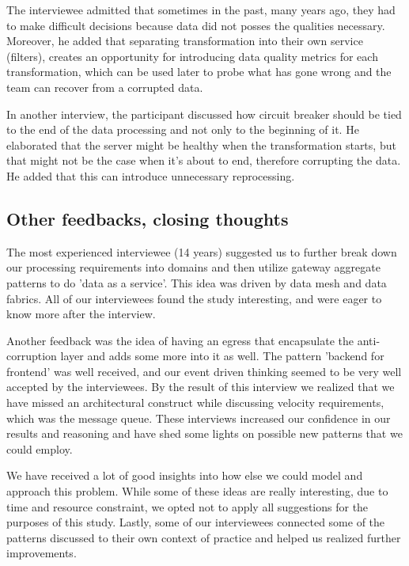 \documentclass{bmcart}
\begin{document}
The interviewee admitted that sometimes in the past, many years ago, they had to make difficult decisions because data did not posses the qualities necessary. Moreover, he added that separating transformation into their own service (filters), creates an opportunity for introducing data quality metrics for each transformation, which can be used later to probe what has gone wrong and the team can recover from a corrupted data.

In another interview, the participant discussed how circuit breaker should be tied to the end of the data processing and not only to the beginning of it. He elaborated that the server might be healthy when the transformation starts, but that might not be the case when it's about to end, therefore corrupting the data. He added that this can introduce unnecessary reprocessing. 



\subsection{Other feedbacks, closing thoughts}


The most experienced interviewee (14 years) suggested us to further break down our processing requirements into domains and then utilize gateway aggregate patterns to do 'data as a service'. This idea was driven by data mesh and data fabrics. All of our interviewees found the study interesting, and were eager to know more after the interview. 

Another feedback was the idea of having an egress that encapsulate the anti-corruption layer and adds some more into it as well. The pattern 'backend for frontend' was well received, and our event driven thinking seemed to be very well accepted by the interviewees. By the result of this interview we realized that we have missed an architectural construct while discussing velocity requirements, which was the message queue. These interviews increased our confidence in our results and reasoning and have shed some lights on possible new patterns that we could employ.

We have received a lot of good insights into how else we could model and approach this problem. While some of these ideas are really interesting, due to time and resource constraint, we opted not to apply all suggestions for the purposes of this study. Lastly, some of our interviewees connected some of the patterns discussed to their own context of practice and helped us realized further improvements. 
\end{document}
